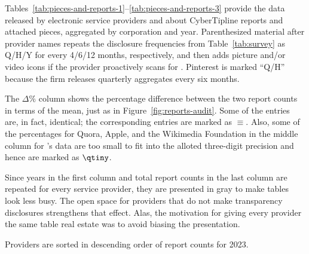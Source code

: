 Tables~\ref{tab:pieces-and-reports-1}--\ref{tab:pieces-and-reports-3} provide
the data released by electronic service providers and  about
CyberTipline reports and attached pieces, aggregated by corporation and year.
Parenthesized material after provider names repeats the disclosure frequencies
from Table~\ref{tab:survey} as Q/H/Y for every 4/6/12 months, respectively, and
then adds picture and/or video icons if the provider proactively scans for
. Pinterest is marked ``Q/H'' because the firm releases quarterly
aggregates every six months.

The $\Delta\%$ column shows the percentage difference between the two report
counts in terms of the mean, just as in Figure~\ref{fig:reports-audit}. Some of
the entries are, in fact, identical; the corresponding entries are marked as
$\equiv$. Also, some of the percentages for Quora, Apple, and the Wikimedia
Foundation in the middle column for 's data are too small to fit into
the alloted three-digit precision and hence are marked as $\qtiny$.

Since years in the first column and total report counts in the last column are
repeated for every service provider, they are presented in gray to make tables
look less busy. The open space for providers that do not make transparency
disclosures strengthens that effect. Alas, the motivation for giving every
provider the same table real estate was to avoid biasing the presentation.

Providers are sorted in descending order of report counts for 2023.
